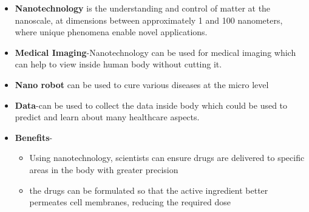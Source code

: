 \documentclass[12pt]{article}
\begin{document}
\begin{itemize}

\item \textbf{Nanotechnology} is the understanding and control of matter at the nanoscale, at dimensions between approximately 1 and 100 nanometers, where unique phenomena enable novel applications.

\item \textbf{Medical Imaging}-Nanotechnology can be used for medical imaging which can help to view inside human body without cutting it.

\item \textbf{Nano robot} can be used to cure various diseases at the micro level

\item \textbf{Data}-can be used to collect the data inside body which could
be used to predict and learn about many healthcare aspects.

\item \textbf{Benefits}-
\begin{itemize}

\item Using nanotechnology, scientists can ensure drugs are delivered to specific areas in the body with greater precision

\item the drugs can be formulated so that the active ingredient better permeates cell membranes, reducing the required dose
\end{itemize}

\end{itemize}
\end{document}
